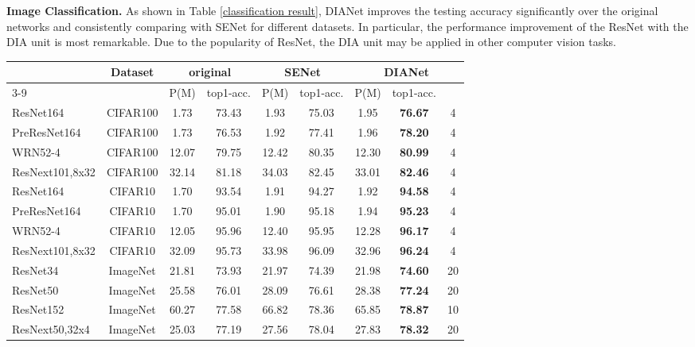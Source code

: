 \documentclass[letterpaper]{article} \usepackage{aaai20}  \usepackage{times}  \usepackage{helvet} \usepackage{courier}  \usepackage[hyphens]{url}  \usepackage{graphicx} \urlstyle{rm} \def\UrlFont{\rm}  \usepackage{graphicx}  \frenchspacing  \setlength{\pdfpagewidth}{8.5in}  \setlength{\pdfpageheight}{11in}  \usepackage{color}
\begin{document}
	\textbf{Image Classification.} As shown in Table \ref{classification result}, DIANet improves the testing accuracy significantly over the original networks and consistently comparing with SENet for different datasets. In particular, the performance improvement of the ResNet with the DIA unit is most remarkable. Due to the popularity of ResNet, the DIA unit may be applied in other computer vision tasks.	
		\begin{table*}[h]
		\centering
		\small
		\begin{tabular}{|l|c|c|c|c|c|c|c|c|}
			\toprule
			& Dataset & \multicolumn{2}{c|}{original} & \multicolumn{2}{c|}{SENet} & \multicolumn{3}{c|}{DIANet} \\
			\cmidrule{3-9}          &       & P(M) & top1-acc. & P(M) & top1-acc. & P(M) & top1-acc. &  \\
			\midrule
			ResNet164 & CIFAR100 & 1.73  & 73.43  & 1.93  & 75.03  & 1.95  & \textbf{76.67 } & 4 \\
			PreResNet164 & CIFAR100 & 1.73  & 76.53  & 1.92  & 77.41  & 1.96  & \textbf{78.20 } & 4 \\
			WRN52-4 & CIFAR100 & 12.07  & 79.75  & 12.42  & 80.35  & 12.30  & \textbf{80.99 } & 4 \\
			ResNext101,8x32 & CIFAR100 & 32.14  & 81.18  & 34.03  & 82.45  & 33.01  & \textbf{82.46 } & 4 \\
			\midrule
			ResNet164 & CIFAR10 & 1.70  & 93.54  & 1.91  & 94.27  & 1.92  & \textbf{94.58 } & 4 \\
			PreResNet164 & CIFAR10 & 1.70  & 95.01  & 1.90  & 95.18  & 1.94  & \textbf{95.23 } & 4 \\
			WRN52-4 & CIFAR10 & 12.05  & 95.96  & 12.40  & 95.95  & 12.28  & \textbf{96.17 } & 4 \\
			ResNext101,8x32 & CIFAR10 & 32.09  & 95.73  & 33.98  & 96.09  & 32.96  & \textbf{96.24 } & 4 \\
			\midrule
			ResNet34 & ImageNet & 21.81     & 73.93  & 21.97    & 74.39  & 21.98     & \textbf{74.60 } & 20 \\
			ResNet50 & ImageNet & 25.58     & 76.01  & 28.09    & 76.61  &  28.38   & \textbf{77.24 } & 20 \\
			ResNet152 & ImageNet & 60.27     & 77.58  & 66.82     & 78.36  &  65.85    & \textbf{78.87 } & 10 \\
			ResNext50,32x4 & ImageNet & 25.03     & 77.19  &  27.56    & 78.04  &  27.83    & \textbf{78.32 } & 20 \\
			\bottomrule
		\end{tabular}\caption{Testing accuracy (\%) on CIFAR10, CIFAR100 and ImageNet 2012. ``P(M)'' means the number of parameters (million). The rightmost ``'' indicates the reduction ratio of DIANet.}
		\label{classification result}\end{table*}
\end{document}
